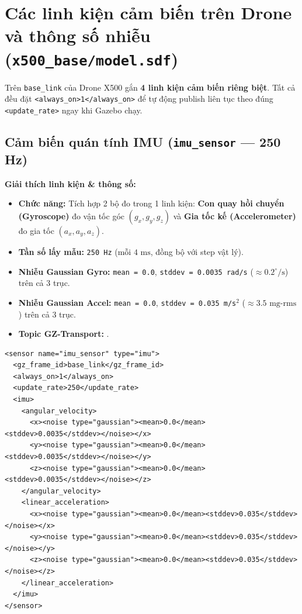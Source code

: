 \documentclass[11pt,a4paper]{article}
\begin{document}
\newpage

\section{Các linh kiện cảm biến trên Drone và thông số nhiễu (\texttt{x500\_base/model.sdf})}

Trên \texttt{base\_link} của Drone X500 gắn \textbf{4 linh kiện cảm biến riêng biệt}. Tất cả đều đặt \texttt{<always\_on>1</always\_on>} để tự động publish liên tục theo đúng \texttt{<update\_rate>} ngay khi Gazebo chạy.

\subsection{Cảm biến quán tính IMU (\texttt{imu\_sensor} — 250 Hz)}
\noindent
\begin{minipage}[t]{0.45\textwidth}
\vspace{0pt}
\textbf{Giải thích linh kiện \& thông số:}
\begin{itemize}
    \item \textbf{Chức năng:} Tích hợp 2 bộ đo trong 1 linh kiện: \textbf{Con quay hồi chuyển (Gyroscope)} đo vận tốc góc $(g_x, g_y, g_z)$ và \textbf{Gia tốc kế (Accelerometer)} đo gia tốc $(a_x, a_y, a_z)$.
    \item \textbf{Tần số lấy mẫu:} \texttt{250 Hz} (mỗi $4\text{ ms}$, đồng bộ với step vật lý).
    \item \textbf{Nhiễu Gaussian Gyro:} \texttt{mean = 0.0}, \texttt{stddev = 0.0035 rad/s} ($\approx 0.2^\circ/\text{s}$) trên cả 3 trục.
    \item \textbf{Nhiễu Gaussian Accel:} \texttt{mean = 0.0}, \texttt{stddev = 0.035 m/s$^2$} ($\approx 3.5\text{ mg-rms}$) trên cả 3 trục.
    \item \textbf{Topic GZ-Transport:} .
\end{itemize}
\end{minipage}
\hfill
\begin{minipage}[t]{0.52\textwidth}
\vspace{0pt}
\begin{lstlisting}[language=SDF, firstnumber=255]
<sensor name="imu_sensor" type="imu">
  <gz_frame_id>base_link</gz_frame_id>
  <always_on>1</always_on>
  <update_rate>250</update_rate>
  <imu>
    <angular_velocity>
      <x><noise type="gaussian"><mean>0.0</mean><stddev>0.0035</stddev></noise></x>
      <y><noise type="gaussian"><mean>0.0</mean><stddev>0.0035</stddev></noise></y>
      <z><noise type="gaussian"><mean>0.0</mean><stddev>0.0035</stddev></noise></z>
    </angular_velocity>
    <linear_acceleration>
      <x><noise type="gaussian"><mean>0.0</mean><stddev>0.035</stddev></noise></x>
      <y><noise type="gaussian"><mean>0.0</mean><stddev>0.035</stddev></noise></y>
      <z><noise type="gaussian"><mean>0.0</mean><stddev>0.035</stddev></noise></z>
    </linear_acceleration>
  </imu>
</sensor>
\end{lstlisting}
\end{minipage}
\end{document}
